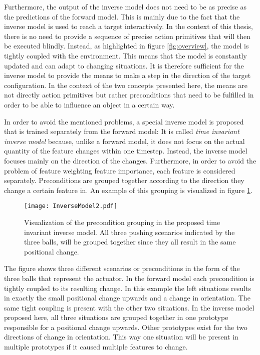 Furthermore, the output of the inverse model does not need to be as precise as the predictions of the forward model. This is mainly due to the fact that the inverse model is used to reach a target interactively. In the context of this thesis, there is no need to provide a sequence of precise action primitives that will then be executed blindly. Instead, as highlighted in figure \ref{fig:overview}, the model is tightly coupled with the environment. This means that the model is constantly updated and can adapt to changing situations. It is therefore sufficient for the inverse model to provide the means to make a step in the direction of the target configuration. In the context of the two concepts presented here, the means are not directly action primitives but rather preconditions that need to be fulfilled in order to be able to influence an object in a certain way.

In order to avoid the mentioned problems, a special inverse model is proposed that is trained separately from the forward model:
It is called \textit{time invariant inverse model} because, unlike a forward model, it does not focus on the actual quantity of the feature changes within one timestep. Instead, the inverse model focuses mainly on the direction of the changes. Furthermore, in order to avoid the problem of feature weighting feature importance, each feature is considered separately. 
Preconditions are grouped together according to the direction they change a certain feature in. An example of this grouping is visualized in figure \ref{fig:InverseModel}. 

\begin{figure}
	\centering
	\texttt{[image: InverseModel2.pdf]}
	\caption{Visualization of the precondition grouping in the proposed time invariant inverse model. All three pushing scenarios indicated by the three balls, will be grouped together since they all result in the same positional change.}
	\label{fig:InverseModel}
\end{figure}

The figure shows three different scenarios or preconditions in the form of the three balls that represent the actuator. In the forward model each precondition is tightly coupled to its resulting change. In this example the left situations results in exactly the small positional change upwards and a change in orientation. The same tight coupling is present with the other two situations. In the inverse model proposed here, all three situations are grouped together in one prototype responsible for a positional change upwards. Other prototypes exist for the two directions of change in orientation. This way one situation will be present in multiple prototypes if it caused multiple features to change.

